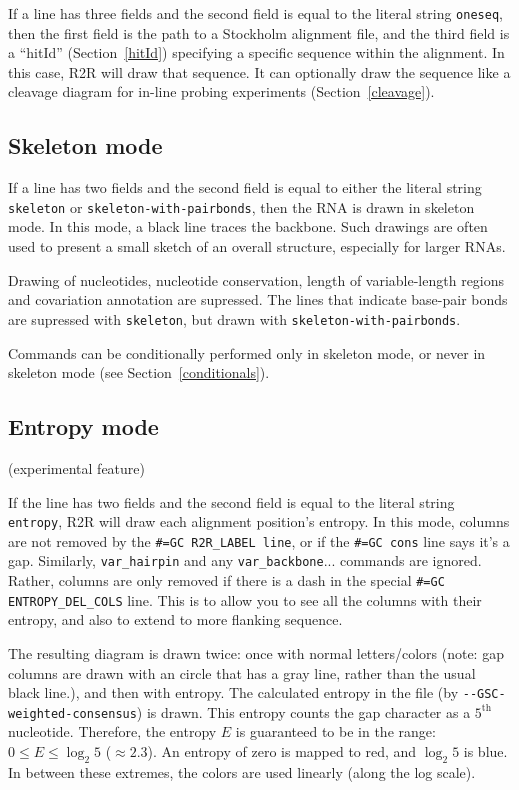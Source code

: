 \documentclass[letterpaper,12pt]{report}
\begin{document}
If a line has three fields and the second field is equal to the literal
string {\tt oneseq}, then the first
field is the path to a Stockholm alignment file, and the third field is
a ``hitId'' (Section~\ref{hitId}) specifying a specific sequence within the alignment.  In this
case, R2R will draw that
sequence.
It can optionally draw the sequence like a cleavage diagram for in-line probing experiments
(Section~\ref{cleavage}).

\subsection{Skeleton mode}
\label{skeleton}

If a line has two fields and the second field is equal to either the literal string
{\tt skeleton} or {\tt skeleton-with-pairbonds}, then the RNA is drawn
in skeleton mode.  In this mode, a black line traces the backbone.  Such
drawings are often used to present a small sketch of an overall structure,
especially for larger RNAs.

Drawing of nucleotides, nucleotide conservation, 
length of variable-length regions and covariation annotation
are supressed.
The lines that indicate base-pair bonds are supressed with {\tt skeleton},
but drawn with {\tt skeleton-with-pairbonds}.

Commands can be conditionally performed only in skeleton mode, or never
in skeleton mode (see Section~\ref{conditionals}).

\subsection{Entropy mode}

(experimental feature)

If the line has two fields and the second field is equal to the literal string
{\tt entropy}, R2R will draw each
alignment position{\textquoteright}s entropy.  In this mode, columns
are not removed by the {\tt \#=GC R2R\_LABEL line}, or if the {\tt \#=GC cons} line says
it's a gap.  Similarly, {\tt var\_hairpin} and any
{\tt var\_backbone}... commands  are ignored.  Rather, columns are only removed
if there is a dash in the special {\tt \#=GC ENTROPY\_DEL\_COLS} line.  This
is to allow you to see all the columns with their entropy, and also to
extend to more flanking sequence.

The resulting diagram is drawn twice: once with normal letters/colors
(note: gap columns are drawn with an circle that has a gray line,
rather than the usual black line.), and then with entropy.  The
calculated entropy in the file (by {\tt -{}-GSC-weighted-consensus}) is drawn.  This
entropy counts the gap character as a $5^{\text{th}}$ nucleotide.
 Therefore, the entropy $E$ is guaranteed to be in the range:  $0 \leq E
\leq \log_{2} 5$ ($\approx 2.3$).  An entropy of zero is
mapped to red, and $\log_{2} 5$ is blue.  In between these
extremes, the colors are used linearly (along the log scale).
\end{document}
